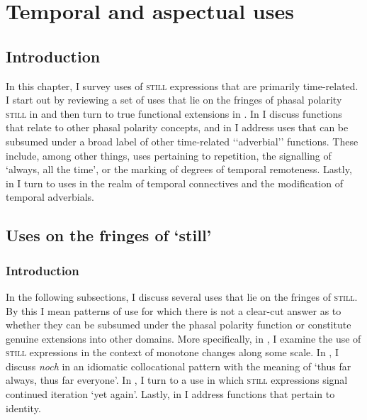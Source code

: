 \chapter{Temporal and aspectual uses}\label{chapter2}
\section{Introduction}
In this chapter, I survey uses of \textsc{still} expressions that are primarily time-related. I start out by reviewing a set of uses that lie on the fringes of phasal polarity \textsc{still} in  and then turn to true functional extensions in . In  I discuss functions that relate to other phasal polarity concepts, and in  I address uses that can be subsumed under a broad label of other time-related \lq\lq adverbial\rq\rq{ }functions. These include, among other things, uses pertaining to repetition, the signalling of \lq always, all the time\rq{}, or the marking of degrees of temporal remoteness. Lastly, in  I turn to uses in the realm of temporal connectives and the modification of temporal adverbials.

\section{Uses on the fringes of \lq still\rq{}}
\label{sectionFringes}
\subsection{Introduction}
In the following subsections, I discuss several uses that lie on the fringes of \textsc{still}. By this I mean patterns of use for which there is not a clear-cut answer as to whether they can be subsumed under the phasal polarity function or constitute genuine extensions into other domains. More specifically, in , I examine the use of \textsc{still} expressions in the context of monotone changes along some scale. In , I discuss  \textit{noch} in an idiomatic collocational pattern with the meaning of \lq thus far always, thus far everyone\rq{}. In , I turn to a use in which \textsc{still} expressions signal continued iteration \lq yet again\rq{}. Lastly, in  I address functions that pertain to identity.

